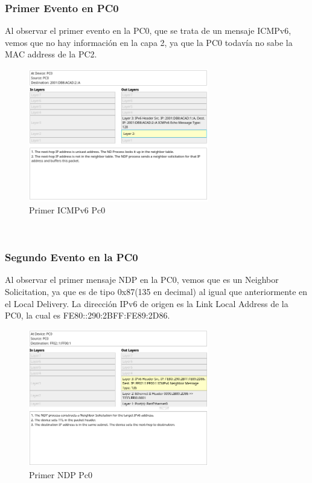 \documentclass[a4paper,12pt]{article}
\begin{document}
\subsubsection{Primer Evento en PC0}
Al observar el primer evento en la PC0, que se trata de un mensaje ICMPv6, vemos que no hay información en la capa 2, ya que la PC0 todavía no sabe la MAC address de la PC2.\\
\begin{figure}[h]
    \centering
    \includegraphics[width=0.7\textwidth]{imagenes/1.png}
    \caption{Primer ICMPv6 Pc0}
\end{figure}\\
\subsubsection{Segundo Evento en la PC0}
Al observar el primer mensaje NDP en la PC0, vemos que es un Neighbor Solicitation, ya que es de tipo 0x87(135 en decimal) al igual que anteriormente en el Local Delivery. La dirección IPv6 de origen es la Link Local Address de la PC0, la cual es FE80::290:2BFF:FE89:2D86.\\
\begin{figure}[h]
    \centering
    \includegraphics[width=0.7\textwidth]{imagenes/2.png}
    \caption{Primer NDP Pc0}
\end{figure}\\
\FloatBarrier
\end{document}
